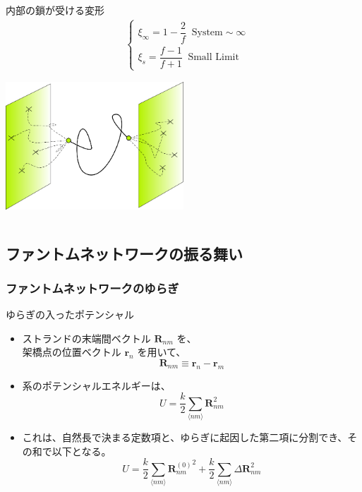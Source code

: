 \documentclass[12pt, dvipdfmx]{beamer}
\begin{document}
\begin{frame}
\begin{columns}[totalwidth=1\textwidth]
\begin{exampleblock}{内部の鎖が受ける変形}
\begin{align*}
							&\begin{cases}
							\xi_{\infty} = 1-\dfrac{2}{f} \;\; \text{System}\sim \infty \\[8pt]
							\xi_{s} = \dfrac{f-1}{f+1} \;\; \text{Small Limit}
							\end{cases}
					\end{align*}
					\vspace{-5mm}
					\begin{center}
						\includegraphics[width=0.5\textwidth]{phantom.png}
					\end{center}
				\end{exampleblock}
		\end{columns}
\end{frame}

\subsection{ファントムネットワークの振る舞い}
\begin{frame}
	\frametitle{ファントムネットワークのゆらぎ}
		\begin{block}{ゆらぎの入ったポテンシャル}
			\begin{itemize}
				\item ストランドの末端間ベクトル $\bm{R}_{nm}$ を、\\架橋点の位置ベクトル $\bm{r}_n$ を用いて、
					\footnotesize
					\begin{equation*}
						\bm{R}_{nm} \equiv \bm{r}_n-\bm{r}_m
					\end{equation*}
					\normalsize
				\item 系のポテンシャルエネルギーは、
					\footnotesize
					\begin{equation*}
						U=\dfrac{k}{2} \sum_{\langle nm \rangle} \bm{R}_{nm}^2
					\end{equation*}
					\normalsize
				\item これは、自然長で決まる定数項と、ゆらぎに起因した第二項に分割でき、その和で以下となる。
					\footnotesize
					\begin{equation*}
						U=\dfrac{k}{2} \sum_{\langle nm \rangle} {\bm{R}_{nm}^{(0)}}^2 + \dfrac{k}{2} \sum_{\langle nm \rangle} \Delta \bm{R}_{nm}^2
					\end{equation*}
					\normalsize
			\end{itemize}
		\end{block}
\end{frame}
\end{document}
